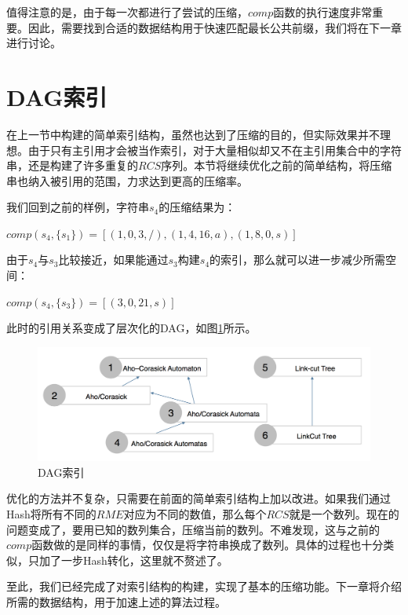 ﻿\documentclass{sysuthesis}
\begin{document}
值得注意的是，由于每一次都进行了尝试的压缩，$comp$函数的执行速度非常重要。因此，需要找到合适的数据结构用于快速匹配最长公共前缀，我们将在下一章进行讨论。



\section{DAG索引}
在上一节中构建的简单索引结构，虽然也达到了压缩的目的，但实际效果并不理想。由于只有主引用才会被当作索引，对于大量相似却又不在主引用集合中的字符串，还是构建了许多重复的$RCS$序列。本节将继续优化之前的简单结构，将压缩串也纳入被引用的范围，力求达到更高的压缩率。\par
我们回到之前的样例，字符串$s_{4}$的压缩结果为：\par
\hspace{1cm}$comp(s_{4}, \{s_{1}\}) = [(1, 0, 3, /), (1, 4, 16, a), (1, 8, 0, s)]$\par
由于$s_{4}$与$s_{3}$比较接近，如果能通过$s_{3}$构建$s_{4}$的索引，那么就可以进一步减少所需空间：\par
\hspace{1cm}$comp(s_{4}, \{s_{3}\}) = [(3, 0, 21, s)]$\par
此时的引用关系变成了层次化的DAG，如图\ref{imag_cdag}所示。\par

\begin{figure}[htbp]
	\centering
	\includegraphics[scale=0.3]{image/cdag.png}
	\caption{DAG索引}\label{imag_cdag}
\end{figure}

优化的方法并不复杂，只需要在前面的简单索引结构上加以改进。如果我们通过Hash将所有不同的$RME$对应为不同的数值，那么每个$RCS$就是一个数列。现在的问题变成了，要用已知的数列集合，压缩当前的数列。不难发现，这与之前的$comp$函数做的是同样的事情，仅仅是将字符串换成了数列。具体的过程也十分类似，只加了一步Hash转化，这里就不赘述了。\par
至此，我们已经完成了对索引结构的构建，实现了基本的压缩功能。下一章将介绍所需的数据结构，用于加速上述的算法过程。
\end{document}
